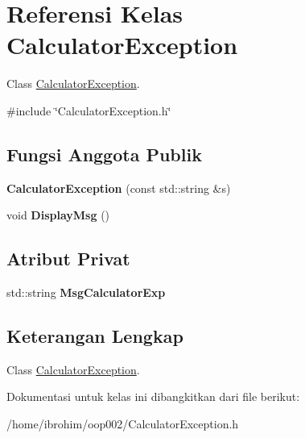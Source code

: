 \hypertarget{classCalculatorException}{}\section{Referensi Kelas Calculator\+Exception}
\label{classCalculatorException}


Class \hyperlink{classCalculatorException}{Calculator\+Exception}.  




{\ttfamily \#include \char`\"{}Calculator\+Exception.\+h\char`\"{}}

\subsection*{Fungsi Anggota Publik}
\begin{DoxyCompactItemize}
\item 
\hypertarget{classCalculatorException_a78b684af841080ee80a6dacbe5a84c7c}{}{\bfseries Calculator\+Exception} (const std\+::string \&s)\label{classCalculatorException_a78b684af841080ee80a6dacbe5a84c7c}

\item 
\hypertarget{classCalculatorException_abb4d4e6abe0c3c13d1b9e28e88bf449c}{}void {\bfseries Display\+Msg} ()\label{classCalculatorException_abb4d4e6abe0c3c13d1b9e28e88bf449c}

\end{DoxyCompactItemize}
\subsection*{Atribut Privat}
\begin{DoxyCompactItemize}
\item 
\hypertarget{classCalculatorException_a1d92ac989bdf1f4e6b2a8d79677f5e50}{}std\+::string {\bfseries Msg\+Calculator\+Exp}\label{classCalculatorException_a1d92ac989bdf1f4e6b2a8d79677f5e50}

\end{DoxyCompactItemize}


\subsection{Keterangan Lengkap}
Class \hyperlink{classCalculatorException}{Calculator\+Exception}. 

Dokumentasi untuk kelas ini dibangkitkan dari file berikut\+:\begin{DoxyCompactItemize}
\item 
/home/ibrohim/oop002/Calculator\+Exception.\+h\end{DoxyCompactItemize}
